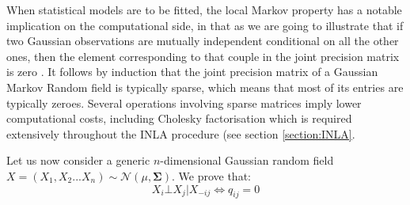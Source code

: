 \documentclass[openany, 11pt, oneside]{book}
\begin{document}
When statistical models are to be fitted, the local Markov property has a notable implication on the computational side, in that as we are going to illustrate that if two Gaussian observations are mutually independent conditional on all the other ones, then the element corresponding to that couple in the joint precision matrix is zero \cite{GMRFs}. It follows by induction that the joint precision matrix of a Gaussian Markov Random field is typically sparse, which means that most of its entries are typically zeroes. Several operations involving sparse matrices imply lower computational costs, including Cholesky factorisation \parencite{GMRFs, INLA} which is required extensively throughout the INLA procedure (see section \ref{section:INLA}. 

Let us now consider a generic $n$-dimensional Gaussian random field $X = (X_1, X_2 .. . X_n) \sim \mathcal{N}(\mu, \boldsymbol{\Sigma})$. We prove that:
\begin{equation}
		X_i \bot X_j \vert X_{-ij} \iff q_{ij} = 0
		\label{eq:zeroprec}
\end{equation}
\end{document}
